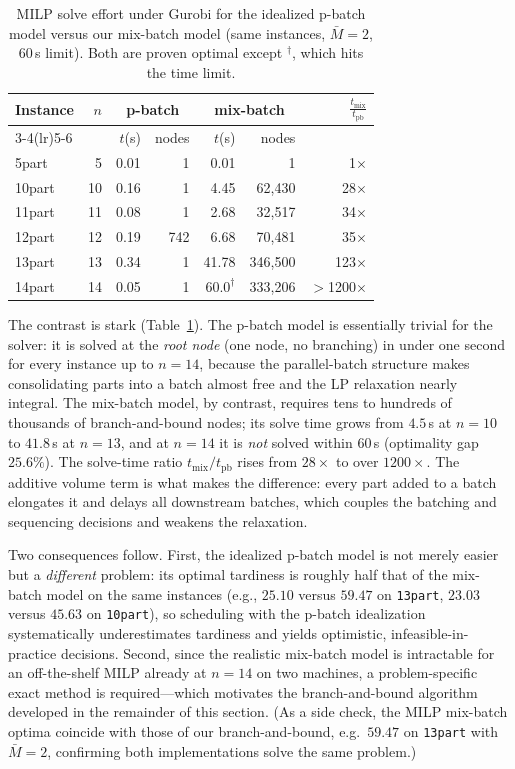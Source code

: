 \documentclass[letterpaper, 10 pt, conference]{ieeeconf}  %
\begin{document}
\begin{table}[t]
\centering
\caption{MILP solve effort under Gurobi for the idealized p-batch model versus
our mix-batch model (same instances, $\bar M=2$, $60$\,s limit). Both are
proven optimal except $^\dagger$, which hits the time limit.}
\label{tab:milp}
\small
\begin{tabular}{l r r r r r r}
\toprule
\multirow{2}{*}{Instance} & \multirow{2}{*}{$n$}
 & \multicolumn{2}{c}{p-batch} & \multicolumn{2}{c}{mix-batch} & \multirow{2}{*}{$\frac{t_{\text{mix}}}{t_{\text{pb}}}$} \\
\cmidrule(lr){3-4}\cmidrule(lr){5-6}
 & & $t$(s) & nodes & $t$(s) & nodes & \\
\midrule
5part  & 5  & 0.01 & 1   & 0.01  & 1        & 1$\times$ \\
10part & 10 & 0.16 & 1   & 4.45  & 62{,}430 & 28$\times$ \\
11part & 11 & 0.08 & 1   & 2.68  & 32{,}517 & 34$\times$ \\
12part & 12 & 0.19 & 742 & 6.68  & 70{,}481 & 35$\times$ \\
13part & 13 & 0.34 & 1   & 41.78 & 346{,}500 & 123$\times$ \\
14part & 14 & 0.05 & 1   & $60.0^\dagger$ & 333{,}206 & $>$1200$\times$ \\
\bottomrule
\end{tabular}
\end{table}

The contrast is stark (Table~\ref{tab:milp}). The p-batch model is essentially
trivial for the solver: it is solved at the \emph{root node} (one node, no
branching) in under one second for every instance up to $n=14$, because the
parallel-batch structure makes consolidating parts into a batch almost free and
the LP relaxation nearly integral. The mix-batch model, by contrast, requires
tens to hundreds of thousands of branch-and-bound nodes; its solve time grows
from $4.5$\,s at $n=10$ to $41.8$\,s at $n=13$, and at $n=14$ it is \emph{not}
solved within $60$\,s (optimality gap $25.6\%$). The solve-time ratio
$t_{\text{mix}}/t_{\text{pb}}$ rises from $28\times$ to over $1200\times$. The
additive volume term is what makes the difference: every part added to a batch
elongates it and delays all downstream batches, which couples the batching and
sequencing decisions and weakens the relaxation.

Two consequences follow. First, the idealized p-batch model is not merely easier
but a \emph{different} problem: its optimal tardiness is roughly half that of the
mix-batch model on the same instances (e.g., $25.10$ versus $59.47$ on
\texttt{13part}, $23.03$ versus $45.63$ on \texttt{10part}), so scheduling with
the p-batch idealization systematically underestimates tardiness and yields
optimistic, infeasible-in-practice decisions. Second, since the realistic
mix-batch model is intractable for an off-the-shelf MILP already at $n=14$ on two
machines, a problem-specific exact method is required---which motivates the
branch-and-bound algorithm developed in the remainder of this section. (As a
side check, the MILP mix-batch optima coincide with those of our
branch-and-bound, e.g.\ $59.47$ on \texttt{13part} with $\bar M=2$, confirming
both implementations solve the same problem.)
\end{document}
